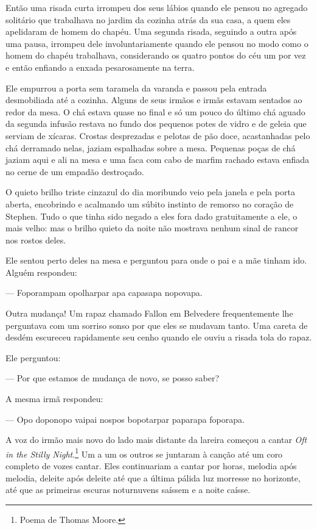 Então uma risada curta irrompeu dos seus lábios quando ele pensou no
agregado solitário que trabalhava no jardim da cozinha atrás da sua
casa, a quem eles apelidaram de homem do chapéu. Uma segunda risada,
seguindo a outra após uma pausa, irrompeu dele involuntariamente quando
ele pensou no modo como o homem do chapéu trabalhava, considerando os
quatro pontos do céu um por vez e então enfiando a enxada pesarosamente
na terra.

Ele empurrou a porta sem taramela da varanda e passou pela entrada
desmobiliada até a cozinha. Alguns de seus irmãos e irmãs estavam
sentados ao redor da mesa. O chá estava quase no final e só um pouco do
último chá aguado da segunda infusão restava no fundo dos pequenos
potes de vidro e de geleia que serviam de xícaras. Crostas desprezadas
e pelotas de pão doce, acastanhadas pelo chá derramado nelas, jaziam
espalhadas sobre a mesa. Pequenas poças de chá jaziam aqui e ali na
mesa e uma faca com cabo de marfim rachado estava enfiada no cerne de
um empadão destroçado.

O quieto brilho triste cinzazul do dia moribundo veio pela janela e pela
porta aberta, encobrindo e acalmando um súbito instinto de remorso no
coração de Stephen. Tudo o que tinha sido negado a eles fora dado
gratuitamente a ele, o mais velho: mas o brilho quieto da noite não
mostrava nenhum sinal de rancor nos rostos deles.

Ele sentou perto deles na mesa e perguntou para onde o pai e a mãe
tinham ido. Alguém respondeu:

 --- Foporampam opolharpar apa capasapa nopovapa.

Outra mudança! Um rapaz chamado Fallon em Belvedere frequentemente lhe
perguntava com um sorriso sonso por que eles se mudavam tanto. Uma
careta de desdém  escureceu rapidamente seu cenho quando ele ouviu a
risada tola do rapaz.

Ele perguntou:

 --- Por que estamos de mudança de novo, se posso saber?

A mesma irmã respondeu:

 --- Opo doponopo vaipai nospos bopotarpar paparapa foporapa.

A voz do irmão mais novo do lado mais distante da lareira começou a
cantar \textit{Oft in the Stilly Night}.\footnote{ Poema de Thomas Moore.} Um a um os outros se juntaram 
à canção até um coro completo de vozes cantar. Eles continuariam a
cantar por horas, melodia após melodia, deleite após deleite até que a
última pálida luz morresse no horizonte, até que as primeiras escuras
noturnuvens saíssem e a noite caísse.                                   

